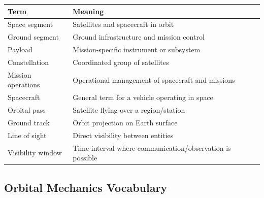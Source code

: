 \documentclass[10pt,a4paper,twocolumn]{article}
\begin{document}
\begin{tabularx}{\columnwidth}{lX}
    \toprule
    Term               & Meaning                                                   \\
    \midrule
    Space segment      & Satellites and spacecraft in orbit                        \\
    Ground segment     & Ground infrastructure and mission control                 \\
    Payload            & Mission-specific instrument or subsystem                  \\
    Constellation      & Coordinated group of satellites                           \\
    Mission operations & Operational management of spacecraft and missions         \\
    Spacecraft         & General term for a vehicle operating in space             \\
    Orbital pass       & Satellite flying over a region/station                    \\
    Ground track       & Orbit projection on Earth surface                         \\
    Line of sight      & Direct visibility between entities                        \\
    Visibility window  & Time interval where communication/observation is possible \\
    \bottomrule
\end{tabularx}


\subsection{Orbital Mechanics Vocabulary}
\end{document}
